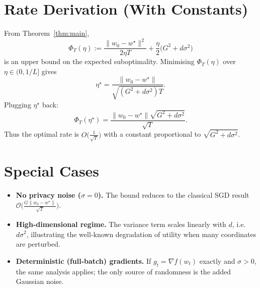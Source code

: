 \documentclass{article}
\begin{document}
\section*{Rate Derivation (With Constants)}
From Theorem~\ref{thm:main},
\[
\Phi_T(\eta):=\frac{\|w_0-w^\star\|^2}{2\eta T}
   +\frac{\eta}{2}\big(G^2+d\sigma^2\big)
\]
is an upper bound on the expected suboptimality.  Minimising $\Phi_T(\eta)$ over $\eta\in(0,1/L]$ gives
\[
\eta^\star=\frac{\|w_0-w^\star\|}{\sqrt{(G^2+d\sigma^2)T}} .
\]
Plugging $\eta^\star$ back:
\[
\Phi_T(\eta^\star)=\frac{\|w_0-w^\star\|\sqrt{G^2+d\sigma^2}}{\sqrt{T}} .
\]
Thus the optimal rate is $O\big(\frac{1}{\sqrt{T}}\big)$ with a constant proportional to $\sqrt{G^2+d\sigma^2}$.

\section*{Special Cases}
\begin{itemize}
\item \textbf{No privacy noise ($\sigma=0$).}  The bound reduces to the classical SGD result $\mathcal O\big(\frac{G\|w_0-w^\star\|}{\sqrt{T}}\big)$.
\item \textbf{High‑dimensional regime.}  The variance term scales linearly with $d$, i.e. $d\sigma^2$, illustrating the well‑known degradation of utility when many coordinates are perturbed.
\item \textbf{Deterministic (full‑batch) gradients.}  If $g_t=\nabla f(w_t)$ exactly and $\sigma>0$, the same analysis applies; the only source of randomness is the added Gaussian noise.
\end{itemize}
\end{document}
